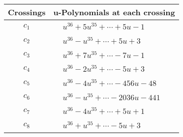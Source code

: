 \documentclass[1p]{elsarticle_modified}
\theoremstyle{definition}
\begin{document}
\begin{tabular}{m{50pt}|m{274pt}}
Crossings & \hspace{64pt}u-Polynomials at each crossing \\
\hline $$\begin{aligned}c_{1}\end{aligned}$$&$\begin{aligned}
&u^{36}+5 u^{35}+\cdots+5 u-1
\end{aligned}$\\
\hline $$\begin{aligned}c_{2}\end{aligned}$$&$\begin{aligned}
&u^{36}- u^{35}+\cdots+5 u+3
\end{aligned}$\\
\hline $$\begin{aligned}c_{3}\end{aligned}$$&$\begin{aligned}
&u^{36}+7 u^{35}+\cdots-7 u-1
\end{aligned}$\\
\hline $$\begin{aligned}c_{4}\end{aligned}$$&$\begin{aligned}
&u^{36}-2 u^{35}+\cdots-5 u+3
\end{aligned}$\\
\hline $$\begin{aligned}c_{5}\end{aligned}$$&$\begin{aligned}
&u^{36}-4 u^{35}+\cdots-456 u-48
\end{aligned}$\\
\hline $$\begin{aligned}c_{6}\end{aligned}$$&$\begin{aligned}
&u^{36}- u^{35}+\cdots-2036 u-441
\end{aligned}$\\
\hline $$\begin{aligned}c_{7}\end{aligned}$$&$\begin{aligned}
&u^{36}-4 u^{35}+\cdots+5 u+1
\end{aligned}$\\
\hline $$\begin{aligned}c_{8}\end{aligned}$$&$\begin{aligned}
&u^{36}+u^{35}+\cdots-5 u+3
\end{aligned}$\\

\end{tabular}
\end{document}
